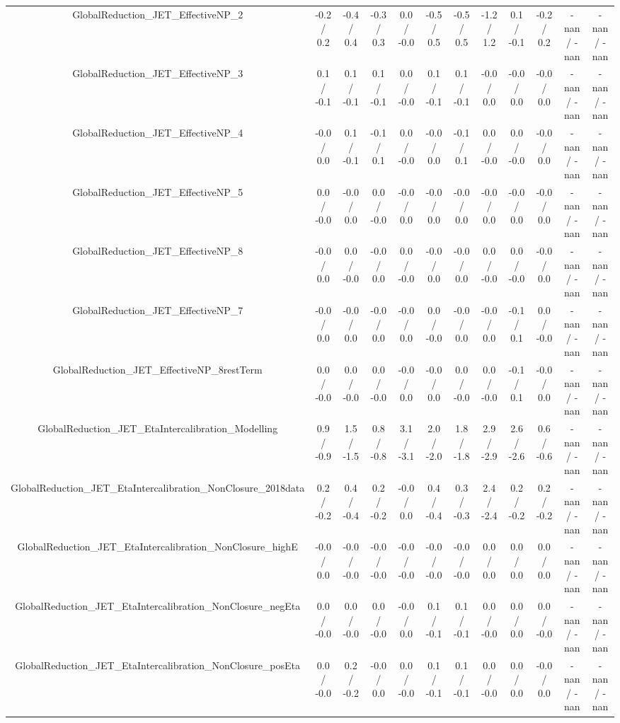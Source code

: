 \begin{table}[htbp]
\begin{center}
\begin{tabular}{|c|c|c|c|c|c|c|c|c|c|c|c|}
  GlobalReduction_JET_EffectiveNP_2 & -0.2 / 0.2 & -0.4 / 0.4 & -0.3 / 0.3 & 0.0 / -0.0 & -0.5 / 0.5 & -0.5 / 0.5 & -1.2 / 1.2 & 0.1 / -0.1 & -0.2 / 0.2 & -nan / -nan & -nan / -nan \\ 
  GlobalReduction_JET_EffectiveNP_3 & 0.1 / -0.1 & 0.1 / -0.1 & 0.1 / -0.1 & 0.0 / -0.0 & 0.1 / -0.1 & 0.1 / -0.1 & -0.0 / 0.0 & -0.0 / 0.0 & -0.0 / 0.0 & -nan / -nan & -nan / -nan \\ 
  GlobalReduction_JET_EffectiveNP_4 & -0.0 / 0.0 & 0.1 / -0.1 & -0.1 / 0.1 & 0.0 / -0.0 & -0.0 / 0.0 & -0.1 / 0.1 & 0.0 / -0.0 & 0.0 / -0.0 & -0.0 / 0.0 & -nan / -nan & -nan / -nan \\ 
  GlobalReduction_JET_EffectiveNP_5 & 0.0 / -0.0 & -0.0 / 0.0 & 0.0 / -0.0 & -0.0 / 0.0 & -0.0 / 0.0 & -0.0 / 0.0 & -0.0 / 0.0 & -0.0 / 0.0 & -0.0 / 0.0 & -nan / -nan & -nan / -nan \\ 
  GlobalReduction_JET_EffectiveNP_8 & -0.0 / 0.0 & 0.0 / -0.0 & -0.0 / 0.0 & 0.0 / -0.0 & -0.0 / 0.0 & -0.0 / 0.0 & 0.0 / -0.0 & 0.0 / -0.0 & -0.0 / 0.0 & -nan / -nan & -nan / -nan \\ 
  GlobalReduction_JET_EffectiveNP_7 & -0.0 / 0.0 & -0.0 / 0.0 & -0.0 / 0.0 & -0.0 / 0.0 & 0.0 / -0.0 & -0.0 / 0.0 & -0.0 / 0.0 & -0.1 / 0.1 & 0.0 / -0.0 & -nan / -nan & -nan / -nan \\ 
  GlobalReduction_JET_EffectiveNP_8restTerm & 0.0 / -0.0 & 0.0 / -0.0 & 0.0 / -0.0 & -0.0 / 0.0 & -0.0 / 0.0 & 0.0 / -0.0 & 0.0 / -0.0 & -0.1 / 0.1 & -0.0 / 0.0 & -nan / -nan & -nan / -nan \\ 
  GlobalReduction_JET_EtaIntercalibration_Modelling & 0.9 / -0.9 & 1.5 / -1.5 & 0.8 / -0.8 & 3.1 / -3.1 & 2.0 / -2.0 & 1.8 / -1.8 & 2.9 / -2.9 & 2.6 / -2.6 & 0.6 / -0.6 & -nan / -nan & -nan / -nan \\ 
  GlobalReduction_JET_EtaIntercalibration_NonClosure_2018data & 0.2 / -0.2 & 0.4 / -0.4 & 0.2 / -0.2 & -0.0 / 0.0 & 0.4 / -0.4 & 0.3 / -0.3 & 2.4 / -2.4 & 0.2 / -0.2 & 0.2 / -0.2 & -nan / -nan & -nan / -nan \\ 
  GlobalReduction_JET_EtaIntercalibration_NonClosure_highE & -0.0 / 0.0 & -0.0 / -0.0 & -0.0 / -0.0 & -0.0 / -0.0 & -0.0 / -0.0 & -0.0 / -0.0 & 0.0 / 0.0 & 0.0 / 0.0 & 0.0 / 0.0 & -nan / -nan & -nan / -nan \\ 
  GlobalReduction_JET_EtaIntercalibration_NonClosure_negEta & 0.0 / -0.0 & 0.0 / -0.0 & 0.0 / -0.0 & -0.0 / 0.0 & 0.1 / -0.1 & 0.1 / -0.1 & 0.0 / -0.0 & 0.0 / 0.0 & 0.0 / -0.0 & -nan / -nan & -nan / -nan \\ 
  GlobalReduction_JET_EtaIntercalibration_NonClosure_posEta & 0.0 / -0.0 & 0.2 / -0.2 & -0.0 / 0.0 & 0.0 / -0.0 & 0.1 / -0.1 & 0.1 / -0.1 & 0.0 / -0.0 & 0.0 / 0.0 & -0.0 / 0.0 & -nan / -nan & -nan / -nan \\ 

\end{tabular}
\end{center}
\end{table}
